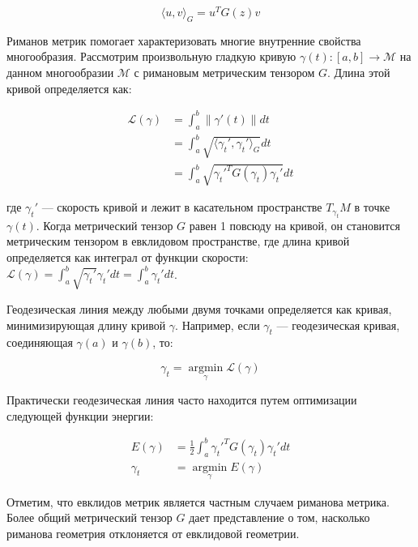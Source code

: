 \documentclass{article}
\begin{document}
\[
\langle u, v \rangle_G = u^T G(z) v
\]

Риманов метрик помогает характеризовать многие внутренние свойства многообразия. Рассмотрим произвольную гладкую кривую \(\gamma(t): [a, b] \rightarrow \mathcal{M}\) на данном многообразии \(\mathcal{M}\) с римановым метрическим тензором \(G\). Длина этой кривой определяется как:

\[
\begin{aligned}
\mathcal{L}(\gamma) & = \int_{a}^{b} \left\| \gamma'(t) \right\| dt \\
& = \int_{a}^{b} \sqrt{\langle \gamma_t', \gamma_t' \rangle_G} dt \\
& = \int_{a}^{b} \sqrt{\gamma_t'^T G(\gamma_t) \gamma_t'} dt
\end{aligned}
\]

где \(\gamma_t'\) — скорость кривой и лежит в касательном пространстве \(T_{\gamma_t} M\) в точке \(\gamma(t)\). Когда метрический тензор \(G\) равен 1 повсюду на кривой, он становится метрическим тензором в евклидовом пространстве, где длина кривой определяется как интеграл от функции скорости: \(\mathcal{L}(\gamma) = \int_{a}^{b} \sqrt{\gamma_t'} \gamma_t' dt = \int_{a}^{b} \gamma_t' dt\).

Геодезическая линия между любыми двумя точками определяется как кривая, минимизирующая длину кривой \(\gamma\). Например, если \(\gamma_t\) — геодезическая кривая, соединяющая \(\gamma(a)\) и \(\gamma(b)\), то:

\[
\gamma_t = \underset{\gamma}{\operatorname{argmin}} \mathcal{L}(\gamma)
\]

Практически геодезическая линия часто находится путем оптимизации следующей функции энергии:

\[
\begin{aligned}
E(\gamma) & = \frac{1}{2} \int_{a}^{b} \gamma_t'^T G(\gamma_t) \gamma_t' dt \\
\gamma_t & = \underset{\gamma}{\operatorname{argmin}} E(\gamma)
\end{aligned}
\]

Отметим, что евклидов метрик является частным случаем риманова метрика. Более общий метрический тензор \(G\) дает представление о том, насколько риманова геометрия отклоняется от евклидовой геометрии.
\end{document}
